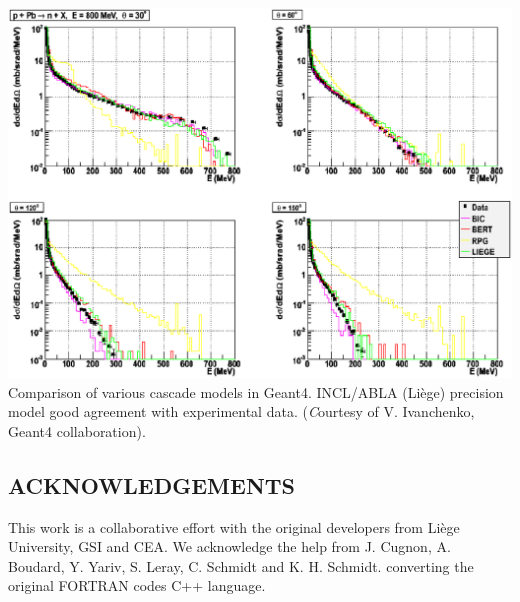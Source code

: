 \documentclass[20pt]{article}
\newenvironment{textbox}
{\begin{lrbox}{\dummybox}\begin{minipage}{0.9\columnwidth}}
{\end{minipage}\end{lrbox}\raisebox{-\depth}{\psshadowbox[framesep=1em,framearc=.1,shadow=true]{\usebox{\dummybox}}}\vspace{0.005\textheight}}
\begin{document}
\begin{center}
\begin{multicols}{3}
\includegraphics[scale=0.45]{images/vladimir.eps}
{\Large {\sf Comparison of various cascade models in Geant4. INCL/ABLA (Li\`ege) precision
model good agreement with experimental data. ({\emph Courtesy of
    V. Ivanchenko, Geant4 collaboration}).}}

\begin{textbox}


\section*{{\Huge {\sf ACKNOWLEDGEMENTS}}}

This work is a collaborative effort with the original developers from
Li\`ege University, GSI and CEA. We acknowledge the help from J. Cugnon,
A. Boudard, Y. Yariv, S. Leray, C. Schmidt and K. H. Schmidt.
converting the original FORTRAN codes C++ language.

\end{textbox}
\vskip2cm
\begin{textbox}


\end{textbox}
\end{multicols}
\end{center}
\end{document}
